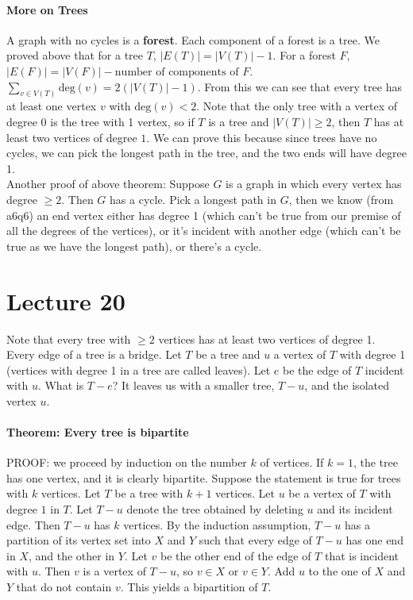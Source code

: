 \documentclass[10pt,letter]{article}
\begin{document}
\paragraph{More on Trees}
A graph with no cycles is a \textbf{forest}. Each component of a forest is a tree. We proved above that for a tree $T$, $|E(T)|=|V(T)|-1$. For a forest $F$, $|E(F)|=|V(F)|-\text{number of components of }F$. $\sum_{v\in V(T)}\text{deg}(v)=2(|V(T)|-1)$. From this we can see that every tree has at least one vertex $v$ with $\text{deg}(v)<2$. Note that the only tree with a vertex of degree 0 is the tree with 1 vertex, so if $T$ is a tree and $|V(T)|\geq2$, then $T$ has at least two vertices of degree $1$. We can prove this because since trees have no cycles, we can pick the longest path in the tree, and the two ends will have degree 1. \\ 
Another proof of above theorem: Suppose $G$ is a graph in which every vertex has degree $\geq2$. Then $G$ has a cycle. Pick a longest path in $G$, then we know (from a6q6) an end vertex either has degree 1 (which can't be true from our premise of all the degrees of the vertices), or it's incident with another edge (which can't be true as we have the longest path), or there's a cycle. 

\section*{Lecture 20}
Note that every tree with $\geq2$ vertices has at least two vertices of degree 1. Every edge of a tree is a bridge. Let $T$ be a tree and $u$ a vertex of $T$ with degree 1 (vertices with degree 1 in a tree are called leaves). Let $e$ be the edge of $T$ incident with $u$. What is $T-e$? It leaves us with a smaller tree, $T-u$, and the isolated vertex $u$. 

\paragraph{Theorem: Every tree is bipartite}
PROOF: we proceed by induction on the number $k$ of vertices. If $k=1$, the tree has one vertex, and it is clearly bipartite. Suppose the statement is true for trees with $k$ vertices. Let $T$ be a tree with $k+1$ vertices. Let $u$ be a vertex of $T$ with degree $1$ in $T$. Let $T-u$ denote the tree obtained by deleting $u$ and its incident edge. Then $T-u$ has $k$ vertices. By the induction assumption, $T-u$ has a partition of its vertex set into $X$ and $Y$ such that every edge of $T-u$ has one end in $X$, and the other in $Y$. Let $v$ be the other end of the edge of $T$ that is incident with $u$. Then $v$ is a vertex of $T-u$, so $v\in X$ or $v\in Y$. Add $u$ to the one of $X$ and $Y$ that do not contain $v$. This yields a bipartition of $T$. 
\end{document}
